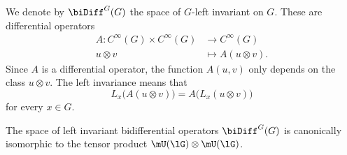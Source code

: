 We denote by $\biDiff^G(G)$ the space of $G$-left invariant  on $G$. These are differential operators
\begin{equation}
	\begin{aligned}
		A\colon  C^{\infty}(G)\times C^{\infty}(G) & \to  C^{\infty}(G)     \\
		u\otimes v                                 & \mapsto A(u\otimes v).
	\end{aligned}
\end{equation}
Since $A$ is a differential operator, the function $A(u,v)$ only depends on the class $u\otimes v$. The left invariance means that
\begin{equation}		\label{EqDefLeftInvarbiDiff}
	L_x\big( A(u\otimes v) \big)=A\big( L_x(u\otimes v) \big)
\end{equation}
for every $x\in G$.

\begin{proposition}		\label{PropbidiffUU}
	The space of left invariant bidifferential operators $\biDiff^G(G)$ is canonically isomorphic to the tensor product $\mU(\lG)\otimes\mU(\lG)$.
\end{proposition}

